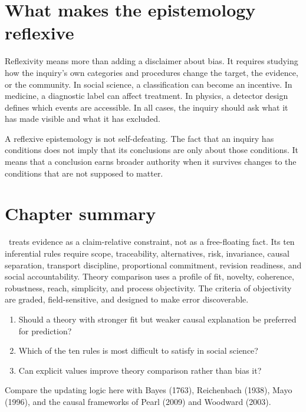 \section{What makes the epistemology reflexive}

Reflexivity means more than adding a disclaimer about bias. It requires
studying how the inquiry's own categories and procedures change the target,
the evidence, or the community. In social science, a classification can
become an incentive. In medicine, a diagnostic label can affect treatment. In
physics, a detector design defines which events are accessible. In all cases,
the inquiry should ask what it has made visible and what it has excluded.

A reflexive epistemology is not self-defeating. The fact that an inquiry has
conditions does not imply that its conclusions are only about those conditions.
It means that a conclusion earns broader authority when it survives changes to
the conditions that are not supposed to matter.

\section*{Chapter summary}

\RCR\ treats evidence as a claim-relative constraint, not as a free-floating
fact. Its ten inferential rules require scope, traceability, alternatives,
risk, invariance, causal separation, transport discipline, proportional
commitment, revision readiness, and social accountability. Theory comparison
uses a profile of fit, novelty, coherence, robustness, reach, simplicity, and
process objectivity. The criteria of objectivity are graded, field-sensitive,
and designed to make error discoverable.

\begin{discussion}
\begin{enumerate}
\item Should a theory with stronger fit but weaker causal explanation be
preferred for prediction?
\item Which of the ten rules is most difficult to satisfy in social science?
\item Can explicit values improve theory comparison rather than bias it?
\end{enumerate}
\end{discussion}

\begin{furtherreading}
Compare the updating logic here with Bayes (1763), Reichenbach (1938), Mayo
(1996), and the causal frameworks of Pearl (2009) and Woodward (2003).
\end{furtherreading}

